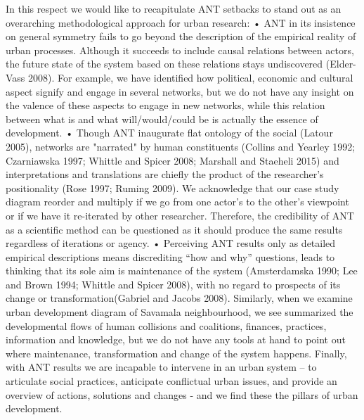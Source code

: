 \documentclass[11pt]{report}
\begin{document}
In this respect we would like to recapitulate ANT setbacks to stand out as an overarching methodological approach for urban research:
•	ANT in its insistence on general symmetry fails to go beyond the description of the empirical reality of urban processes. Although it succeeds to include causal relations between actors, the future state of the system based on these relations stays undiscovered (Elder-Vass 2008). For example, we have identified how political, economic and cultural aspect signify and engage in several networks, but we do not have any insight on the valence of these aspects to engage in new networks, while this relation between what is and what will/would/could be is actually the essence of development.
•	Though ANT inaugurate flat ontology of the social (Latour 2005), networks are "narrated" by human constituents (Collins and Yearley 1992; Czarniawska 1997; Whittle and Spicer 2008;  Marshall and Staeheli 2015) and interpretations and translations are chiefly the product of the researcher’s positionality  (Rose 1997;  Ruming 2009). We acknowledge that our case study diagram reorder and multiply if we go from one actor’s to the other’s viewpoint or if we have it re-iterated by other researcher. Therefore, the credibility of ANT as a scientific method can be questioned as it should produce the same results regardless of iterations or agency.
•	Perceiving ANT results only as detailed empirical descriptions means discrediting “how and why” questions, leads to thinking that its sole aim is maintenance of the system   (Amsterdamska 1990; Lee and Brown 1994; Whittle and Spicer 2008), with no regard to prospects of its change or transformation(Gabriel and Jacobs 2008). Similarly, when we examine urban development diagram of Savamala neighbourhood, we see summarized the developmental ﬂows of human collisions and coalitions, finances, practices, information and knowledge, but we do not have any tools at hand to point out where maintenance, transformation and change of the system happens. Finally, with ANT results we are incapable to intervene in an urban system – to articulate social practices, anticipate conflictual urban issues, and provide an overview of actions, solutions and changes - and we find these the pillars of urban development. 
\end{document}
